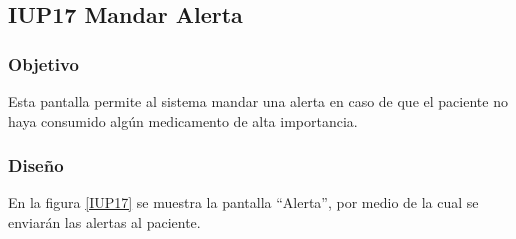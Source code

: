 \subsection{IUP17 Mandar Alerta}
 
\subsubsection{Objetivo}

    Esta pantalla permite al sistema mandar una alerta en caso de que el paciente no haya consumido algún medicamento de alta importancia.

\subsubsection{Diseño}

    En la figura \ref{IUP17} se muestra la pantalla ``Alerta'', por medio de la cual se enviarán las alertas al paciente. \\
\newpage

%
%
